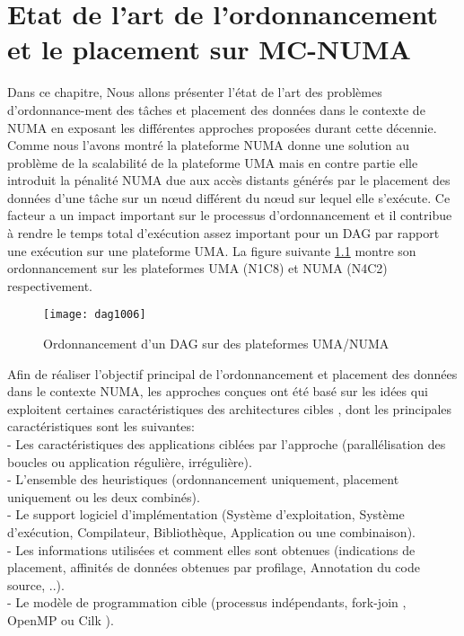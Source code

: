 ﻿\chapter{Etat de l'art de l'ordonnancement et le  placement sur MC-NUMA} \label{chapter:opdag} 
%
Dans ce chapitre, Nous allons présenter l'état de l'art des problèmes d'ordonnance-ment des tâches et placement des données dans le contexte de NUMA en exposant les différentes approches proposées durant cette décennie. Comme nous l'avons montré la plateforme NUMA donne une solution au problème de la scalabilité de la plateforme UMA mais en contre partie elle introduit la pénalité NUMA due aux accès distants générés par le placement des données d'une tâche sur un nœud différent du nœud sur lequel elle s'exécute. Ce facteur a un impact important sur le processus d'ordonnancement et il contribue à rendre le temps total d'exécution assez important pour un DAG par rapport  %
une exécution sur une plateforme UMA.
La figure suivante \ref{fig:FG_2_dag1006} montre son ordonnancement sur les plateformes UMA (N1C8) et NUMA (N4C2) respectivement.
%
\begin{figure}
\texttt{[image: dag1006]}
\centering
\caption{Ordonnancement d'un DAG sur des plateformes UMA/NUMA}
\label{fig:FG_2_dag1006}
\end{figure}
%
Afin de réaliser l'objectif principal de l'ordonnancement et placement des données dans le contexte NUMA, les approches conçues ont été basé sur les idées qui exploitent certaines caractéristiques des architectures cibles \cite{Dreb15},
dont les principales caractéristiques sont les suivantes: \\  
- Les caractéristiques des applications ciblées par l'approche (parallélisation des boucles ou application régulière, irrégulière). \\
- L'ensemble des heuristiques (ordonnancement uniquement, placement uniquement ou les deux combinés). \\
- Le support logiciel d'implémentation (Système d'exploitation, Système d'exécution, Compilateur, Bibliothèque, Application ou une combinaison). \\
- Les informations utilisées et comment elles sont obtenues (indications de placement, affinités de données obtenues par profilage, Annotation du code source, ..).\\
- Le modèle de programmation cible (processus indépendants, fork-join \cite{FJ11} ,  OpenMP \cite{Omp00} \cite{Omp01} \cite{Omp02} ou Cilk \cite{Cil00} \cite{Cil01}).

